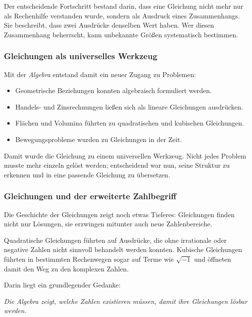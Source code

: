 Der entscheidende Fortschritt bestand darin,
dass eine Gleichung nicht mehr nur als Rechenhilfe verstanden wurde,
sondern als Ausdruck eines Zusammenhangs.
Sie beschreibt, dass zwei Ausdrücke denselben Wert haben.
Wer diesen Zusammenhang beherrscht,
kann unbekannte Größen systematisch bestimmen.

\subsubsection*{Gleichungen als universelles Werkzeug}
Mit der \emph{Algebra} entstand damit ein neuer Zugang zu Problemen:

\begin{itemize}
	\item Geometrische Beziehungen konnten algebraisch formuliert werden.
	\item Handels- und Zinsrechnungen ließen sich als lineare Gleichungen ausdrücken.
	\item Flächen und Volumina führten zu quadratischen und kubischen Gleichungen.
	\item Bewegungsprobleme wurden zu Gleichungen in der Zeit.
\end{itemize}

Damit wurde die Gleichung zu einem universellen Werkzeug.
Nicht jedes Problem musste mehr einzeln gelöst werden;
entscheidend war nun, seine Struktur zu erkennen und in eine passende Gleichung zu übersetzen.

\subsubsection*{Gleichungen und der erweiterte Zahlbegriff}
Die Geschichte der Gleichungen zeigt noch etwas Tieferes:
Gleichungen finden nicht nur Lösungen,
sie erzwingen mitunter auch neue Zahlenbereiche.

Quadratische Gleichungen führten auf Ausdrücke,
die ohne irrationale oder negative Zahlen nicht sinnvoll behandelt werden konnten.
Kubische Gleichungen führten in bestimmten Rechenwegen sogar auf Terme wie \(\sqrt{-1}\)
und öffneten damit den Weg zu den komplexen Zahlen.

Darin liegt ein grundlegender Gedanke:
\medskip

\textit{Die Algebra zeigt, welche Zahlen existieren müssen,
	damit ihre Gleichungen lösbar werden.}

